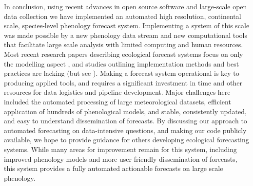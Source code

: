 In conclusion, using recent advances in open source software and large-scale open data collection we have implemented an automated high resolution, continental scale, species-level phenology forecast system. Implementing a system of this scale was made possible by a new phenology data stream and new computational tools that facilitate large scale analysis with limited computing and human resources. Most recent research papers describing ecological forecast systems focus on only the modelling aspect \citep{chen2011, carrillo2018, vandoren2018}, and studies outlining implementation methods and best practices are lacking (but see \cite{white2018, welch2019}). Making a forecast system operational is key to producing applied tools, and requires a significant investment in time and other resources for data logistics and pipeline development. Major challenges here included the automated processing of large meteorological datasets, efficient application of hundreds of phenological models, and stable, consistently updated, and easy to understand dissemination of forecasts. By discussing our approach to automated forecasting on data-intensive questions, and making our code publicly available, we hope to provide guidance for others developing ecological forecasting systems. While many areas for improvement remain for this system, including improved phenology models and more user friendly dissemination of forecasts, this system provides a fully automated actionable forecasts on large scale phenology.